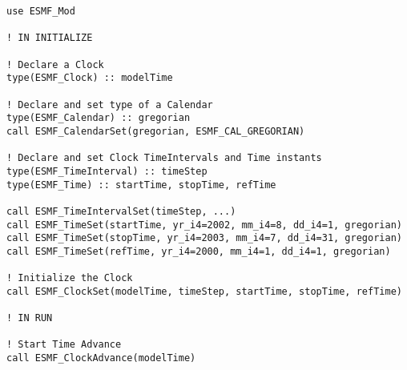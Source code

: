 
\begin{verbatim}
use ESMF_Mod

! IN INITIALIZE

! Declare a Clock
type(ESMF_Clock) :: modelTime

! Declare and set type of a Calendar
type(ESMF_Calendar) :: gregorian
call ESMF_CalendarSet(gregorian, ESMF_CAL_GREGORIAN)

! Declare and set Clock TimeIntervals and Time instants
type(ESMF_TimeInterval) :: timeStep
type(ESMF_Time) :: startTime, stopTime, refTime

call ESMF_TimeIntervalSet(timeStep, ...)
call ESMF_TimeSet(startTime, yr_i4=2002, mm_i4=8, dd_i4=1, gregorian)
call ESMF_TimeSet(stopTime, yr_i4=2003, mm_i4=7, dd_i4=31, gregorian)
call ESMF_TimeSet(refTime, yr_i4=2000, mm_i4=1, dd_i4=1, gregorian)

! Initialize the Clock
call ESMF_ClockSet(modelTime, timeStep, startTime, stopTime, refTime)

! IN RUN

! Start Time Advance
call ESMF_ClockAdvance(modelTime)
\end{verbatim}


